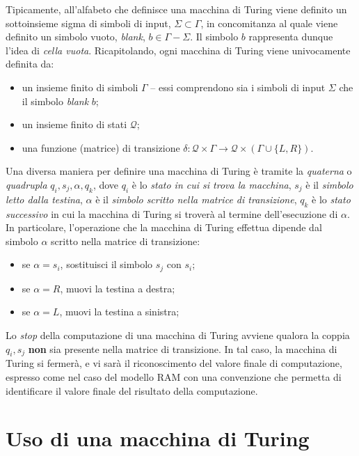 \documentclass[10pt]{book}
\begin{document}
Tipicamente, all'alfabeto che definisce una macchina di Turing viene definito
un sottoinsieme sigma di simboli di input, $\Sigma \subset \Gamma$, in
concomitanza al quale viene definito un simbolo vuoto, \emph{blank}, $b \in
\Gamma - \Sigma$. Il simbolo $b$ rappresenta dunque l'idea di \emph{cella
vuota}. Ricapitolando, ogni macchina di Turing viene univocamente definita da:
\begin{itemize}
    \item un insieme finito di simboli $\Gamma$ \--- essi comprendono sia i
        simboli di input $\Sigma$ che il simbolo \emph{blank} $b$;
    \item un insieme finito di stati $\mathcal Q$;
    \item una funzione (matrice) di transizione $\delta  : \mathcal Q \times
        \Gamma \rightarrow \mathcal Q \times (\Gamma \cup \{L,R\})$.
\end{itemize}

Una diversa maniera per definire una macchina di Turing è tramite la
\emph{quaterna} o \emph{quadrupla} $q_i, s_j, \alpha, q_k$, dove $q_i$ è lo
\emph{stato in cui si trova la macchina}, $s_j$ è il \emph{simbolo letto dalla
testina}, $\alpha$ è il \emph{simbolo scritto nella matrice di transizione}, $q_k$ è
lo \emph{stato successivo} in cui la macchina di Turing si troverà al termine
dell'esecuzione di $\alpha$. In particolare, l'operazione che la macchina di
Turing effettua dipende dal simbolo $\alpha$ scritto nella matrice di
transizione:
\begin{itemize}
    \item se $\alpha = s_i$, sostituisci il simbolo $s_j$ con $s_i$;
    \item se $\alpha = R$, muovi la testina a destra;
    \item se $\alpha = L$, muovi la testina a sinistra;
\end{itemize}

Lo \emph{stop} della computazione di una macchina di Turing avviene qualora la
coppia $q_i, s_j$ \textbf{non} sia presente nella matrice di transizione. In
tal caso, la macchina di Turing si fermerà, e vi sarà il riconoscimento del
valore finale di computazione, espresso come nel caso del modello RAM con una
convenzione che permetta di identificare il valore finale del risultato della
computazione.

\section{Uso di una macchina di Turing}
\end{document}

